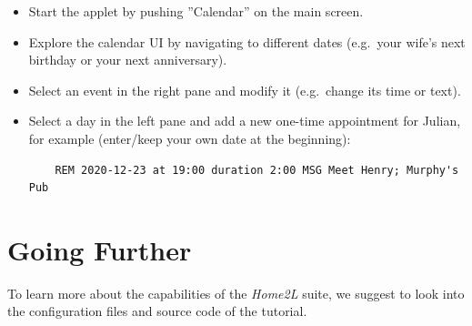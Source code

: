 \documentclass[12pt,english,parskip=half,headheight=19pt]{scrreprt}
\begin{document}
\begin{itemize}[$\blacktriangleright$]
\item
  Start the applet by pushing ''Calendar'' on the main screen.
\item
  Explore the calendar UI by navigating to different dates (e.g.~your wife's
  next birthday or your next anniversary).
\item
  Select an event in the right pane and modify it (e.g.~change its time
  or text).
\item
  Select a day in the left pane and add a new one-time appointment for
  Julian, for example (enter/keep your own date at the beginning):
  \begin{lstlisting}
    REM 2020-12-23 at 19:00 duration 2:00 MSG Meet Henry; Murphy's Pub
  \end{lstlisting}
\end{itemize}





\clearpage
\section{Going Further}
\label{sec:tutorial-goingfurther}


To learn more about the capabilities of the \textit{Home2L} suite, we
suggest to look into the configuration files and source code of the
tutorial.
\end{document}
